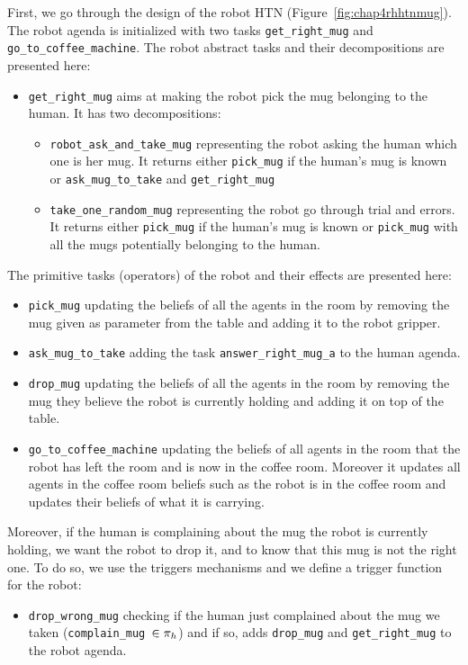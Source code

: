 \documentclass[a4paper,11pt,twoside]{StyleThese}
\begin{document}
First, we go through the design of the robot HTN (Figure~\ref{fig:chap4rhhtnmug}). The robot agenda is initialized with two tasks \verb'get_right_mug' and \verb'go_to_coffee_machine'. The robot abstract tasks and their decompositions are presented here:
\begin{itemize}
\item \verb'get_right_mug' aims at making the robot pick the mug belonging to the human. It has two decompositions:
	\begin{itemize}
	\item \verb'robot_ask_and_take_mug' representing the robot asking the human which one is her mug. It returns either \verb'pick_mug' if the human's mug is known or \verb'ask_mug_to_take' and \verb'get_right_mug'
	\item \verb'take_one_random_mug' representing the robot go through trial and errors. It returns either \verb'pick_mug' if the human's mug is known or \verb'pick_mug' with all the mugs potentially belonging to the human.
	\end{itemize}
\end{itemize}
The primitive tasks (operators) of the robot and their effects are presented here:
\begin{itemize}
\item \verb'pick_mug' updating the beliefs of all the agents in the room by removing the mug given as parameter from the table and adding it to the robot gripper.
\item \verb'ask_mug_to_take' adding the task \verb'answer_right_mug_a' to the human agenda.
\item \verb'drop_mug' updating the beliefs of all the agents in the room by removing the mug they believe the robot is currently holding and adding it on top of the table.
\item \verb'go_to_coffee_machine' updating the beliefs of all agents in the room that the robot has left the room and is now in the coffee room. Moreover it updates all agents in the coffee room beliefs such as the robot is in the coffee room and updates their beliefs of what it is carrying.
\end{itemize}
Moreover, if the human is complaining about the mug the robot is currently holding, we want the robot to drop it, and to know that this mug is not the right one. To do so, we use the triggers mechanisms and we define a trigger function for the robot:
\begin{itemize}
\item \verb'drop_wrong_mug' checking if the human just complained about the mug we taken (\verb'complain_mug'~$\in \pi_h$) and if so, adds \verb'drop_mug' and \verb'get_right_mug' to the robot agenda.
\end{itemize}
\end{document}
